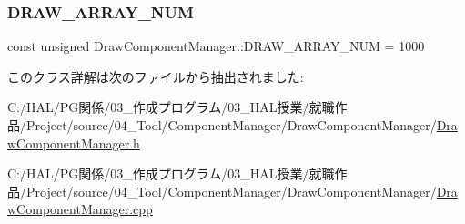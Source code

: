 \mbox{\label{class_draw_component_manager_aa48e10b399a1d423f4e6896b69cfd213}} 
\subsubsection{\texorpdfstring{D\+R\+A\+W\+\_\+\+A\+R\+R\+A\+Y\+\_\+\+N\+UM}{DRAW\_ARRAY\_NUM}}
{\footnotesize\ttfamily const unsigned Draw\+Component\+Manager\+::\+D\+R\+A\+W\+\_\+\+A\+R\+R\+A\+Y\+\_\+\+N\+UM = 1000\hspace{0.3cm}{\ttfamily [static]}}



このクラス詳解は次のファイルから抽出されました\+:\begin{DoxyCompactItemize}
\item 
C\+:/\+H\+A\+L/\+P\+G関係/03\+\_\+作成プログラム/03\+\_\+\+H\+A\+L授業/就職作品/\+Project/source/04\+\_\+\+Tool/\+Component\+Manager/\+Draw\+Component\+Manager/\mbox{\hyperlink{_draw_component_manager_8h}{Draw\+Component\+Manager.\+h}}\item 
C\+:/\+H\+A\+L/\+P\+G関係/03\+\_\+作成プログラム/03\+\_\+\+H\+A\+L授業/就職作品/\+Project/source/04\+\_\+\+Tool/\+Component\+Manager/\+Draw\+Component\+Manager/\mbox{\hyperlink{_draw_component_manager_8cpp}{Draw\+Component\+Manager.\+cpp}}\end{DoxyCompactItemize}
